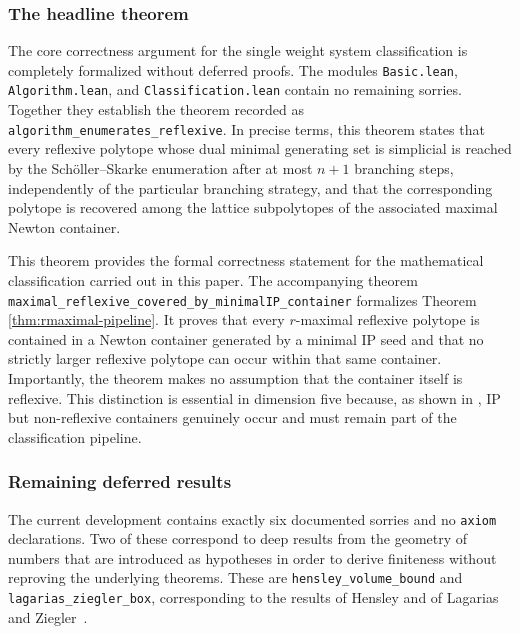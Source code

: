\documentclass[appliedmath,article,submit,moreauthors]{Definitions/mdpi}
\begin{document}
\subsubsection{The headline theorem}

The core correctness argument for the single weight system classification is
completely formalized without deferred proofs. The modules
\nolinkurl{Basic.lean}, \nolinkurl{Algorithm.lean}, and
\nolinkurl{Classification.lean} contain no remaining sorries. Together they
establish the theorem recorded as \nolinkurl{algorithm\_enumerates\_reflexive}.
In precise terms, this theorem states that every reflexive polytope whose dual
minimal generating set is simplicial is reached by the Sch\"oller--Skarke
enumeration after at most \(n+1\) branching steps, independently of the
particular branching strategy, and that the corresponding polytope is recovered
among the lattice subpolytopes of the associated maximal Newton container.

This theorem provides the formal correctness statement for the mathematical
classification carried out in this paper. The accompanying theorem
\nolinkurl{maximal\_reflexive\_covered\_by\_minimalIP\_container} formalizes
Theorem \ref{thm:rmaximal-pipeline}. It proves that every \(r\)-maximal reflexive
polytope is contained in a Newton container generated by a minimal IP seed and
that no strictly larger reflexive polytope can occur within that same container.
Importantly, the theorem makes no assumption that the container itself is
reflexive. This distinction is essential in dimension five because, as shown in
, IP but non-reflexive containers genuinely occur and
must remain part of the classification pipeline.

\subsubsection{Remaining deferred results}

The current development contains exactly six documented sorries and no
\nolinkurl{axiom} declarations. Two of these correspond to deep results from the
geometry of numbers that are introduced as hypotheses in order to derive
finiteness without reproving the underlying theorems. These are
\nolinkurl{hensley\_volume\_bound} and \nolinkurl{lagarias\_ziegler\_box},
corresponding to the results of Hensley and of Lagarias and
Ziegler~\cite{Hensley1983,LagariasZiegler1991}.
\end{document}
